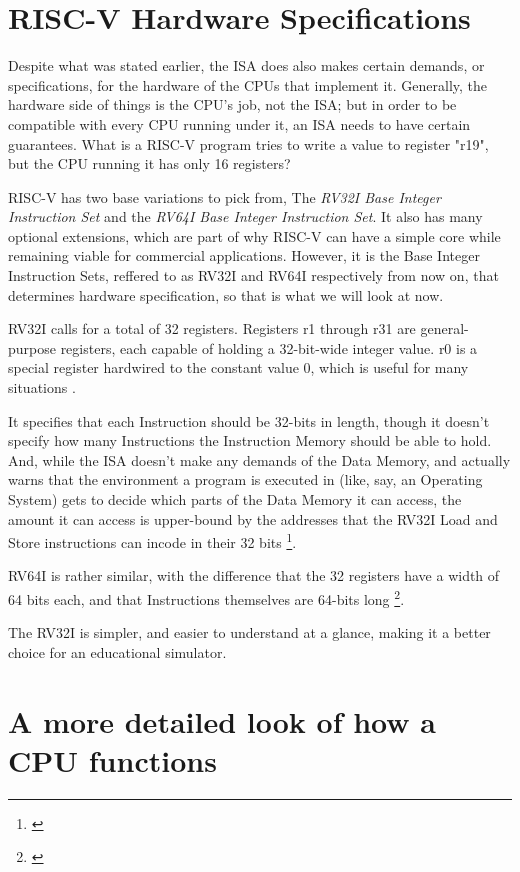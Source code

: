 \documentclass[12pt,twoside]{reedthesis}
\begin{document}
\section{RISC-V Hardware Specifications}

Despite what was stated earlier, the ISA  does also makes certain demands, or specifications, for the hardware of the CPUs that implement it. Generally, the hardware side of things is the CPU's job, not the ISA; but in order to be compatible with every CPU running under it, an ISA needs to have certain guarantees. What is a RISC-V program tries to write a value to register "r19", but the CPU running it has only 16 registers?

RISC-V has two base variations to pick from, The \textit{RV32I Base Integer Instruction Set} and the \textit{RV64I Base Integer Instruction Set}. It also has many optional extensions, which are part of why RISC-V can have a simple core while remaining viable for commercial applications. However, it is the Base Integer Instruction Sets, reffered to as RV32I and RV64I respectively from now on, that determines hardware specification, so that is what we will look at now.

RV32I calls for a total of 32 registers. Registers r1 through r31 are general-purpose registers, each capable of holding a 32-bit-wide integer value. r0 is a special register hardwired to the constant value 0, which is useful for many situations .

It specifies that each Instruction should be 32-bits in length, though it doesn't specify how many Instructions the Instruction Memory should be able to hold. And, while the ISA doesn't make any demands of the Data Memory, and actually warns that the environment a program is executed in (like, say, an Operating System) gets to decide which parts of the Data Memory it can access, the amount it can access is upper-bound by the addresses that the RV32I Load and Store instructions can incode in their 32 bits \footnote{\cite{waterman}}.

RV64I is rather similar, with the difference that the 32 registers have a width of 64 bits each, and that Instructions themselves are 64-bits long \footnote{\cite{waterman}}.

The RV32I is simpler, and easier to understand at a glance, making it a better choice for an educational simulator.

\section{A more detailed look of how a CPU functions}
\end{document}
